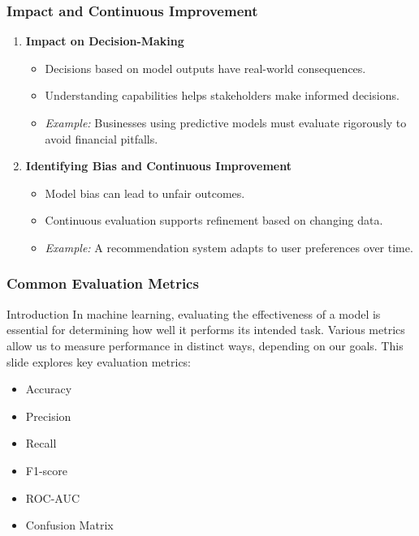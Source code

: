 \documentclass[aspectratio=169]{beamer}
\begin{document}
\begin{frame}[fragile]
    \frametitle{Impact and Continuous Improvement}
    \begin{enumerate}
        \item \textbf{Impact on Decision-Making}
            \begin{itemize}
                \item Decisions based on model outputs have real-world consequences.
                \item Understanding capabilities helps stakeholders make informed decisions.
                \item \textit{Example:} Businesses using predictive models must evaluate rigorously to avoid financial pitfalls.
            \end{itemize}

        \item \textbf{Identifying Bias and Continuous Improvement}
            \begin{itemize}
                \item Model bias can lead to unfair outcomes.
                \item Continuous evaluation supports refinement based on changing data.
                \item \textit{Example:} A recommendation system adapts to user preferences over time.
            \end{itemize}
    \end{enumerate}
\end{frame}

\begin{frame}[fragile]
    \frametitle{Common Evaluation Metrics}
    \begin{block}{Introduction}
        In machine learning, evaluating the effectiveness of a model is essential for determining how well it performs its intended task. Various metrics allow us to measure performance in distinct ways, depending on our goals. This slide explores key evaluation metrics:
        \begin{itemize}
            \item Accuracy
            \item Precision
            \item Recall
            \item F1-score
            \item ROC-AUC
            \item Confusion Matrix
        \end{itemize}
    \end{block}
\end{frame}
\end{document}
